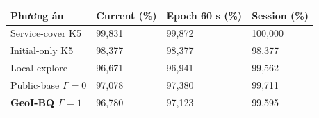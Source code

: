 \par\smallskip\noindent\begin{tabularx}{\linewidth}{@{}P{4.3cm}XXX@{}}\toprule
\textbf{Phương án} & \textbf{Current (\%)} & \textbf{Epoch 60 s (\%)} & \textbf{Session (\%)} \\
\midrule
Service-cover K5 & 99{,}831 & 99{,}872 & 100{,}000 \\
Initial-only K5 & 98{,}377 & 98{,}377 & 98{,}377 \\
Local explore & 96{,}671 & 96{,}941 & 99{,}562 \\
Public-base $\Gamma=0$ & 97{,}078 & 97{,}380 & 99{,}711 \\
\textbf{GeoI-BQ $\Gamma=1$} & 96{,}780 & 97{,}123 & 99{,}595 \\
\bottomrule\end{tabularx}\par\smallskip
